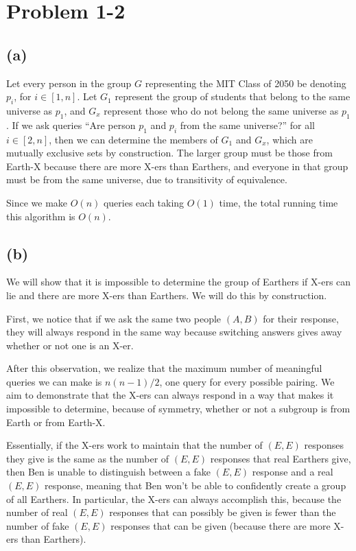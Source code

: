 \documentclass{6046}
\begin{document}
\section*{Problem 1-2}
\subsection*{(a)}
Let every person in the group $G$ representing the MIT Class of 2050 be
denoting $p_i$, for $i \in [1, n]$. Let $G_1$ represent the group of
students that belong to the same universe as $p_1$, and $G_x$ represent
those who do not belong the same universe as $p_1$. If we ask queries
``Are person $p_1$ and $p_i$ from the same universe?'' for all $i
\in [2, n]$, then we can determine the members of $G_1$ and $G_x$, which
are mutually exclusive sets by construction. The larger group must be those
from Earth-X because there are more X-ers than Earthers, and everyone in that
group must be from the same universe, due to transitivity of equivalence.

Since we make $O(n)$ queries each taking $O(1)$ time, the total running time
this algorithm is $O(n)$.

\subsection*{(b)}
We will show that it is impossible to determine the group of Earthers
if X-ers can lie and there are more X-ers than Earthers. We will do this by
construction.

First, we notice that if we ask the same two people $(A, B)$ for their
response, they will always respond in the same way because switching answers
gives away whether or not one is an X-er.

After this observation, we realize that the maximum number of meaningful
queries we can make is $n(n - 1)/2$, one query for every possible pairing.
We aim to demonstrate that the X-ers can always respond in a way that makes
it impossible to determine, because of symmetry, whether or not a subgroup
is from Earth or from Earth-X.

Essentially, if the X-ers work to maintain that the number of $(E, E)$ responses
they give is the same as the number of $(E, E)$ responses that real
Earthers give, then Ben is unable to distinguish between a fake $(E, E)$ response
and a real $(E, E)$ response, meaning that Ben won't be able to confidently
create a group of all Earthers. In particular, the X-ers can always accomplish
this, because the number of real $(E, E)$ responses that can possibly be given
is fewer than the number of fake $(E, E)$ responses that can be given (because
there are more X-ers than Earthers).
\end{document}
